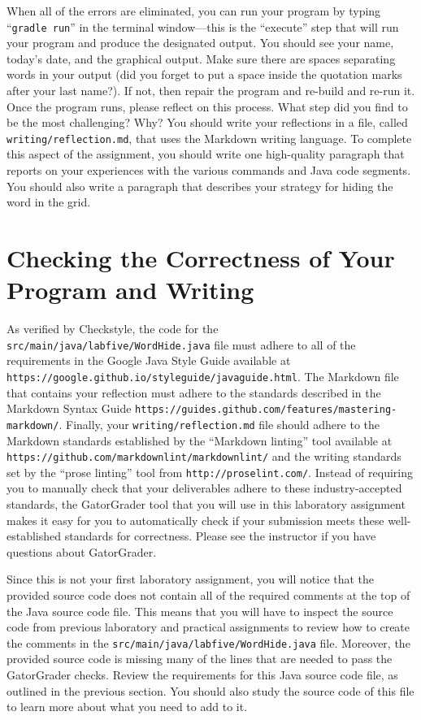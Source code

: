 \documentclass[11pt]{article}
\newcommand{\mainprogramsource}{\lstinline{src/main/java/labfive/WordHide.java}}
\newcommand{\reflection}{\lstinline{writing/reflection.md}}
\newcommand{\gradlerun}{\command{gradle run}}
\newcommand{\command}[1]{``\lstinline{#1}''}
\newcommand{\url}[1]{\lstinline{#1}}
\newcommand{\step}[1]{``{#1}''}
\begin{document}
When all of the errors are eliminated, you can run your program by typing
\gradlerun{} in the terminal window---this is the ``execute'' step that will run
your program and produce the designated output. You should see your name,
today's date, and the graphical output. Make sure there are spaces separating
words in your output (did you forget to put a space inside the quotation marks
after your last name?). If not, then repair the program and re-build and re-run
it. Once the program runs, please reflect on this process. What step did you
find to be the most challenging? Why? You should write your reflections in a
file, called \reflection{}, that uses the Markdown writing language. To complete
this aspect of the assignment, you should write one high-quality paragraph that
reports on your experiences with the various commands and Java code segments.
You should also write a paragraph that describes your strategy for hiding the
word in the grid.

\section*{Checking the Correctness of Your Program and Writing}

As verified by Checkstyle, the code for the \mainprogramsource{} file must
adhere to all of the requirements in the Google Java Style Guide available at
\url{https://google.github.io/styleguide/javaguide.html}. The Markdown file that
contains your reflection must adhere to the standards described in the Markdown
Syntax Guide \url{https://guides.github.com/features/mastering-markdown/}.
Finally, your \reflection{} file should adhere to the Markdown standards
established by the \step{Markdown linting} tool available at
\url{https://github.com/markdownlint/markdownlint/} and the writing standards
set by the \step{prose linting} tool from \url{http://proselint.com/}. Instead
of requiring you to manually check that your deliverables adhere to these
industry-accepted standards, the GatorGrader tool that you will use in this
laboratory assignment makes it easy for you to automatically check if your
submission meets these well-established standards for correctness. Please see
the instructor if you have questions about GatorGrader.

Since this is not your first laboratory assignment, you will notice that the
provided source code does not contain all of the required comments at the top of
the Java source code file. This means that you will have to inspect the source
code from previous laboratory and practical assignments to review how to create
the comments in the \mainprogramsource{} file. Moreover, the provided source
code is missing many of the lines that are needed to pass the GatorGrader
checks. Review the requirements for this Java source code file, as outlined in
the previous section. You should also study the source code of this file to
learn more about what you need to add to it.
\end{document}
